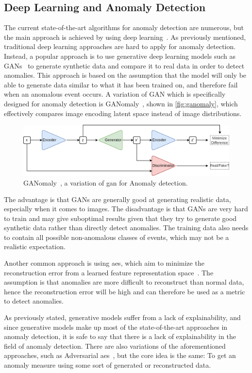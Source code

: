 \subsection{Deep Learning and Anomaly Detection}
\label{sec:dl_anom_detection}
The current state-of-the-art algorithms for anomaly detection are numerous, but the main approach is achieved by using deep learning~\cite{anomaly_detection}. As previously mentioned, traditional deep learning approaches are hard to apply for anomaly detection. Instead, a popular approach is to use generative deep learning models such as GANs~\cite{anomaly_detection, ganomaly,anomalyvideo} to generate synthetic data and compare it to real data in order to detect anomalies. This approach is based on the assumption that the model will only be able to generate data similar to what it has been trained on, and therefore fail when an anomalous event occurs. A variation of GAN which is specifically designed for anomaly detection is GANomaly~\cite{ganomaly}, shown in \autoref{fig:ganomaly}, which effectively compares image encoding latent space instead of image distributions.
\begin{figure}[htb]
    \centering
    \includegraphics[width=\linewidth]{resources/related_works/ganomaly}
    \caption[GANomaly Visualization]{GANomaly~\cite{ganomaly}, a variation of \gls*{gan} for Anomaly detection.}
    \label{fig:ganomaly}
\end{figure}
\par
The advantage is that GANs are generally good at generating realistic data, especially when it comes to images. The disadvantage is that GANs are very hard to train and may give suboptimal results given that they try to generate good synthetic data rather than directly detect anomalies. The training data also needs to contain all possible non-anomalous classes of events, which may not be a realistic expectation.
\par

Another common approach is using \glspl*{ae}, which aim to minimize the reconstruction error from a learned feature representation space~\cite{autoencoder1,anomaly_detection,anomalyvideo}. The assumption is that anomalies are more difficult to reconstruct than normal data, hence the reconstruction error will be high and can therefore be used as a metric to detect anomalies.
\par
As previously stated, generative models suffer from a lack of explainability, and since generative models make up most of the state-of-the-art approaches in anomaly detection, it is safe to say that there is a lack of explainability in the field of anomaly detection. There are also variations of the aforementioned approaches, such as Adversarial \glspl*{ae}~\cite{adversarial_aes}, but the core idea is the same: To get an anomaly measure using some sort of generated or reconstructed data.

